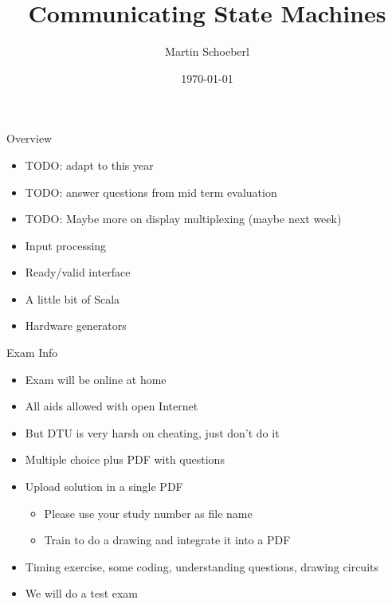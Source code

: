 

\newif\ifbook


\title{Communicating State Machines}
\author{Martin Schoeberl}
\date{\today}



\begin{frame}
\titlepage
\end{frame}

\begin{frame}[fragile]{Overview}
\begin{itemize}
\item TODO: adapt to this year
\item TODO: answer questions from mid term evaluation
\item TODO: Maybe more on display multiplexing (maybe next week)
\item Input processing
\item Ready/valid interface
\item A little bit of Scala
\item Hardware generators
\end{itemize}
\end{frame}

\begin{frame}[fragile]{Exam Info}
\begin{itemize}
\item Exam will be online at home
\item All aids allowed with open Internet
\item But DTU is very harsh on cheating, just don't do it
\item Multiple choice plus PDF with questions
\item Upload solution in a single PDF
\begin{itemize}
\item Please use your study number as file name
\item Train to do a drawing and integrate it into a PDF
\end{itemize}
\item Timing exercise, some coding, understanding questions, drawing circuits
\item We will do a test exam
\end{itemize}
\end{frame}

